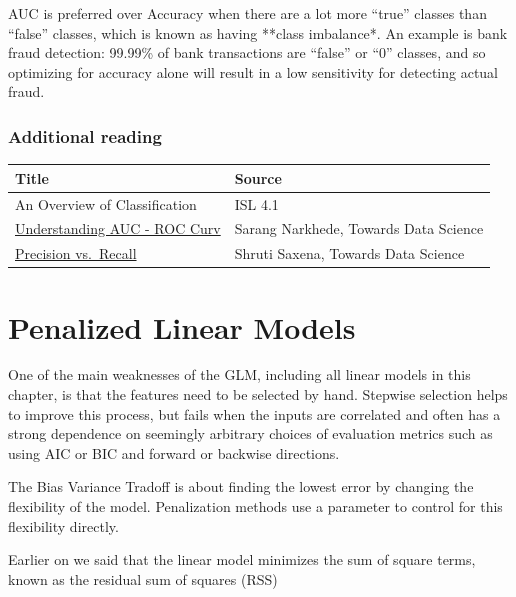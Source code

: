 \documentclass[openany]{book}
\begin{document}
AUC is preferred over Accuracy when there are a lot more ``true'' classes than ``false'' classes, which is known as having **class imbalance*. An example is bank fraud detection: 99.99\% of bank transactions are ``false'' or ``0'' classes, and so optimizing for accuracy alone will result in a low sensitivity for detecting actual fraud.

\hypertarget{additional-reading}{%
\subsection{Additional reading}\label{additional-reading}}

\begin{longtable}[]{@{}ll@{}}
\toprule
Title & Source\tabularnewline
\midrule
\endhead
An Overview of Classification & ISL 4.1\tabularnewline
\href{https://towardsdatascience.com/understanding-auc-roc-curve-68b2303cc9c5\#:~:targetText=What\%20is\%20AUC\%20\%2D\%20ROC\%20Curve\%3F,capable\%20of\%20distinguishing\%20between\%20classes.}{Understanding AUC - ROC Curv} & Sarang Narkhede, Towards Data Science\tabularnewline
\href{https://towardsdatascience.com/precision-vs-recall-386cf9f89488\#:~:targetText=Precision\%20and\%20recall\%20are\%20two,correctly\%20classified\%20by\%20your\%20algorithm.}{Precision vs.~Recall} & Shruti Saxena, Towards Data Science\tabularnewline
\bottomrule
\end{longtable}

\hypertarget{penalized-linear-models}{%
\chapter{Penalized Linear Models}\label{penalized-linear-models}}

One of the main weaknesses of the GLM, including all linear models in this chapter, is that the features need to be selected by hand. Stepwise selection helps to improve this process, but fails when the inputs are correlated and often has a strong dependence on seemingly arbitrary choices of evaluation metrics such as using AIC or BIC and forward or backwise directions.

The Bias Variance Tradoff is about finding the lowest error by changing the flexibility of the model. Penalization methods use a parameter to control for this flexibility directly.

Earlier on we said that the linear model minimizes the sum of square terms, known as the residual sum of squares (RSS)
\end{document}
